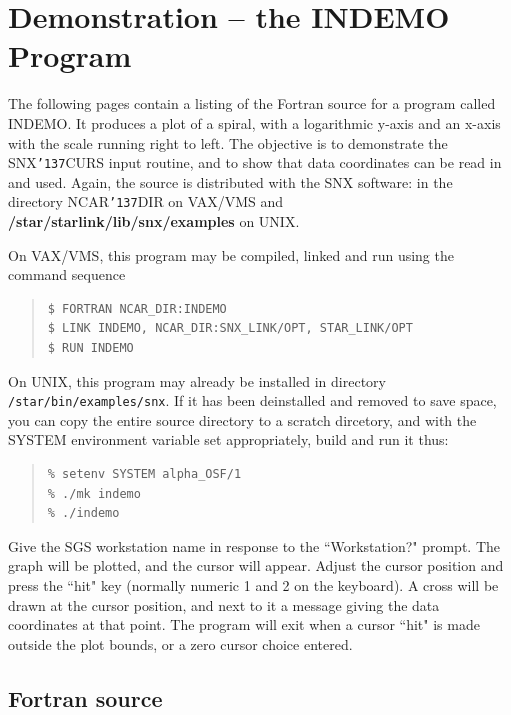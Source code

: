 \documentclass[11pt]{article}
\renewcommand{\_}{{\tt\char'137}}     %
\begin{document}
\section {Demonstration -- the INDEMO Program} \label{demo3_sect}

The following pages contain a listing of the Fortran source for a program
called INDEMO.
It produces a plot of a spiral, with a logarithmic y-axis and an x-axis with
the scale running right to left.
The objective is to demonstrate the SNX\_CURS input routine, and to show that
data coordinates can be read in and used.
Again, the source is distributed with the SNX software: in the directory
NCAR\_DIR on VAX/VMS and {\bf /star/\-starlink/\-lib/\-snx/examples} on UNIX.

On VAX/VMS, this program may be compiled, linked and run using the command
sequence

\begin {quote}
\begin{verbatim}
$ FORTRAN NCAR_DIR:INDEMO
$ LINK INDEMO, NCAR_DIR:SNX_LINK/OPT, STAR_LINK/OPT
$ RUN INDEMO
\end{verbatim}
\end {quote}

On UNIX, this program may already be installed in directory 
{\tt /star/bin/examples/snx}.  If it has been deinstalled and removed to save
space, you can copy the entire source directory to a scratch dircetory, and
with the SYSTEM environment variable set appropriately, build and run it thus:

\begin {quote}
\begin{verbatim}
% setenv SYSTEM alpha_OSF/1
% ./mk indemo
% ./indemo
\end{verbatim}
\end {quote}

Give the SGS workstation name in response to the ``Workstation?" prompt.
The graph will be plotted, and the cursor will appear.
Adjust the cursor position and press the ``hit" key (normally numeric 1 and 2
on the keyboard).
A cross will be drawn at the cursor position, and next
to it a message giving the data coordinates at that point.
The program will exit when a cursor ``hit" is made outside the plot bounds,
or a zero cursor choice entered.


\subsection {Fortran source}
\end{document}
